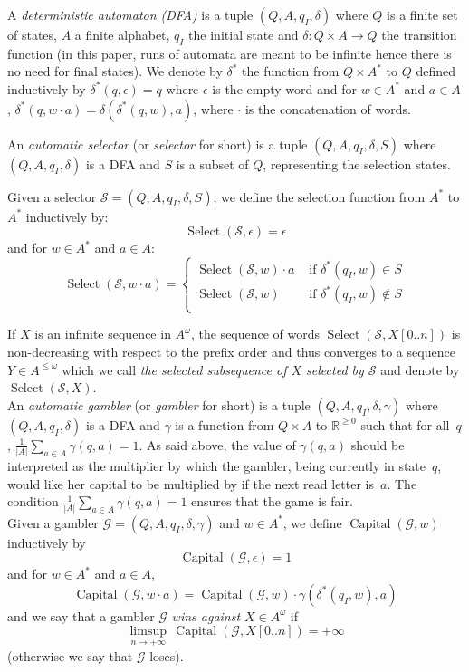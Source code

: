 \documentclass[11pt]{article}
\newcommand{\R}{\mathbb{R}}
\renewcommand{\S}{\mathcal{S}}
\newcommand{\G}{\mathcal{G}}
\newcommand{\emptystr}{\epsilon}
\DeclareMathOperator{\select}{Select}
\DeclareMathOperator{\capital}{Capital}
\begin{document}
A \emph{deterministic automaton (DFA)} is a tuple $(Q,A,q_I,\delta)$ where $Q$ is a finite set of states, $A$ a finite alphabet, $q_I$ the initial state and $\delta: Q \times 	A \rightarrow Q$ the transition function (in this paper, runs of automata are meant to be infinite hence there is no need for final states). We denote by $\delta^*$ the function from $Q \times A^*$ to $Q$ defined inductively by $\delta^*(q,\emptystr)=q$ where $\emptystr$ is the empty word and for $w \in A^*$ and $a \in A$, $\delta^*(q,w \cdot a) = \delta(\delta^*(q,w),a)$, where $\cdot$ is the concatenation of words. 

An \emph{automatic selector} (or \emph{selector} for short) is a tuple $(Q,A,q_I,\delta,S)$ where $(Q,A,q_I,\delta)$ is a DFA and $S$ is a subset of $Q$, representing the selection states. 

Given a selector $\S=(Q,A,q_I,\delta,S)$, we define the selection function from $A^*$ to $A^*$ inductively by:
\[
\select(\S,\emptystr)=\emptystr
\]
and for $w \in A^*$ and $a \in A$:
\[
\select(\S,w \cdot a) = \left \{
\begin{array}{lr}
\select(\S,w) \cdot a &  \text{ if } \delta^*(q_I,w) \in S\\
\select(\S,w) &  \text{ if } \delta^*(q_I,w) \notin S\\
\end{array}
\right.
\]

If $X$ is an infinite sequence in $A^\omega$, the sequence of words $\select(\S,X[0..n])$ is non-decreasing with respect to the prefix order and thus converges to a sequence $Y \in A^{\leq \omega}$ which we call \emph{the selected subsequence of $X$ selected by $\S$} and denote by $\select(\S,X)$. \\

An \emph{automatic gambler} (or \emph{gambler} for short) is a tuple $(Q,A,q_I,\delta,\gamma)$ where $(Q,A,q_I,\delta)$ is a DFA and $\gamma$ is a function from $Q \times A$ to $\R^{\geq 0}$ such that for all~$q$, $\frac{1}{|A|}\sum_{a \in A} \gamma(q,a)=1$. As said above, the value of $\gamma(q,a)$ should be interpreted as the multiplier by which the gambler, being currently in state~$q$, would like her capital to be multiplied by if the next read letter is~$a$. The condition $\frac{1}{|A|} \sum_{a \in A} \gamma(q,a)=1$ ensures that the game is fair. \\


Given a gambler $\G=(Q,A,q_I,\delta,\gamma)$ and $w \in A^*$, we define $\capital(\G,w)$ inductively by
\[
\capital(\G,\emptystr)=1
\] 
and for $w \in A^*$ and $a \in A$,
\[
\capital(\G,w \cdot a)=\capital(\G,w) \cdot \gamma(\delta^*(q_I,w),a)
\]
and we say that a gambler $\G$ \emph{wins against $X \in A^\omega$} if 
\[
\limsup_{n \rightarrow +\infty}\,  \capital(\G,X[0..n]) = +\infty
\]
(otherwise we say that $\G$ loses). 
\end{document}
